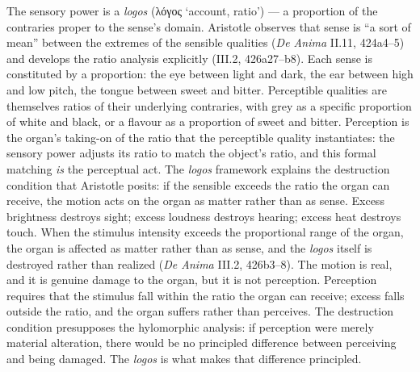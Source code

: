 \documentclass{article}
\newcommand{\gk}[1]{{\greekfont #1}}
\begin{document}
The sensory power is a \textit{logos} (\gk{λόγος} `account, ratio') --- a proportion of the contraries proper to the sense's domain. Aristotle observes that sense is ``a sort of mean'' between the extremes of the sensible qualities (\textit{De Anima} II.11, 424a4--5) and develops the ratio analysis explicitly (III.2, 426a27--b8). Each sense is constituted by a proportion: the eye between light and dark, the ear between high and low pitch, the tongue between sweet and bitter. Perceptible qualities are themselves ratios of their underlying contraries, with grey as a specific proportion of white and black, or a flavour as a proportion of sweet and bitter. Perception is the organ's taking-on of the ratio that the perceptible quality instantiates: the sensory power adjusts its ratio to match the object's ratio, and this formal matching \textit{is} the perceptual act. The \textit{logos} framework explains the destruction condition that Aristotle posits: if the sensible exceeds the ratio the organ can receive, the motion acts on the organ as matter rather than as sense. Excess brightness destroys sight; excess loudness destroys hearing; excess heat destroys touch. When the stimulus intensity exceeds the proportional range of the organ, the organ is affected as matter rather than as sense, and the \textit{logos} itself is destroyed rather than realized (\textit{De Anima} III.2, 426b3--8). The motion is real, and it is genuine damage to the organ, but it is not perception. Perception requires that the stimulus fall within the ratio the organ can receive; excess falls outside the ratio, and the organ suffers rather than perceives. The destruction condition presupposes the hylomorphic analysis: if perception were merely material alteration, there would be no principled difference between perceiving and being damaged. The \textit{logos} is what makes that difference principled.
\end{document}
